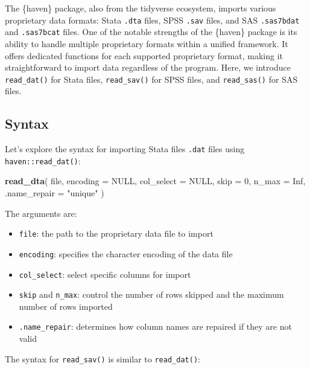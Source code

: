 \documentclass[
]{krantz}
\makeatletter
\newenvironment{Shaded}{\begin{snugshade}}{\end{snugshade}}
\newcommand{\AttributeTok}[1]{\textcolor[rgb]{0.27,0.27,0.27}{#1}}
\newcommand{\ConstantTok}[1]{\textcolor[rgb]{0.37,0.37,0.37}{#1}}
\newcommand{\DecValTok}[1]{\textcolor[rgb]{0.06,0.06,0.06}{#1}}
\newcommand{\FunctionTok}[1]{\textcolor[rgb]{0.27,0.27,0.27}{\textbf{#1}}}
\newcommand{\NormalTok}[1]{#1}
\newcommand{\StringTok}[1]{\textcolor[rgb]{0.5,0.5,0.5}{#1}}
\providecommand{\tightlist}{%
  \setlength{\itemsep}{0pt}\setlength{\parskip}{0pt}}
\newenvironment{kframe}{%
\medskip{}
\setlength{\fboxsep}{.8em}
 \def\at@end@of@kframe{}%
 \ifinner\ifhmode%
  \def\at@end@of@kframe{\end{minipage}}%
  \begin{minipage}{\columnwidth}%
 \fi\fi%
 \def\FrameCommand##1{\hskip\@totalleftmargin \hskip-\fboxsep
 \colorbox{shadecolor}{##1}\hskip-\fboxsep
     \hskip-\linewidth \hskip-\@totalleftmargin \hskip\columnwidth}%
 \MakeFramed {\advance\hsize-\width
   \@totalleftmargin\z@ \linewidth\hsize
   \@setminipage}}%
 {\par\unskip\endMakeFramed%
 \at@end@of@kframe}
\renewenvironment{Shaded}{\begin{kframe}}{\end{kframe}}
\makeatother
\begin{document}
The \{haven\} package, also from the tidyverse ecosystem, imports various proprietary data formats: Stata \texttt{.dta} files, SPSS \texttt{.sav} files, and SAS \texttt{.sas7bdat} and \texttt{.sas7bcat} files. One of the notable strengths of the \{haven\} package is its ability to handle multiple proprietary formats within a unified framework. It offers dedicated functions for each supported proprietary format, making it straightforward to import data regardless of the program. Here, we introduce \texttt{read\_dat()} for Stata files, \texttt{read\_sav()} for SPSS files, and \texttt{read\_sas()} for SAS files.

\hypertarget{syntax-9}{%
\subsection{Syntax}\label{syntax-9}}

Let's explore the syntax for importing Stata files \texttt{.dat} files using \texttt{haven::read\_dat()}:

\begin{Shaded}
\begin{Highlighting}[]
\FunctionTok{read\_dta}\NormalTok{(}
\NormalTok{  file,}
  \AttributeTok{encoding =} \ConstantTok{NULL}\NormalTok{,}
  \AttributeTok{col\_select =} \ConstantTok{NULL}\NormalTok{,}
  \AttributeTok{skip =} \DecValTok{0}\NormalTok{,}
  \AttributeTok{n\_max =} \ConstantTok{Inf}\NormalTok{,}
  \AttributeTok{.name\_repair =} \StringTok{"unique"}
\NormalTok{)}
\end{Highlighting}
\end{Shaded}

The arguments are:

\begin{itemize}
\tightlist
\item
  \texttt{file}: the path to the proprietary data file to import
\item
  \texttt{encoding}: specifies the character encoding of the data file
\item
  \texttt{col\_select}: select specific columns for import
\item
  \texttt{skip} and \texttt{n\_max}: control the number of rows skipped and the maximum number of rows imported
\item
  \texttt{.name\_repair}: determines how column names are repaired if they are not valid
\end{itemize}

The syntax for \texttt{read\_sav()} is similar to \texttt{read\_dat()}:
\end{document}
